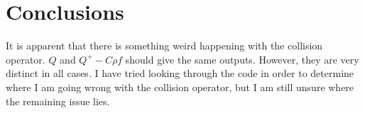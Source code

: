 \documentclass{article}
\begin{document}
\section{Conclusions}
It is apparent that there is something weird happening with the collision operator. $Q$ and $Q^+ - C \rho f$ should give the same outputs. However, they are very distinct in all cases. I have tried looking through the code in order to determine where I am going wrong with the collision operator, but I am still unsure where the remaining issue lies. 



\end{document}

